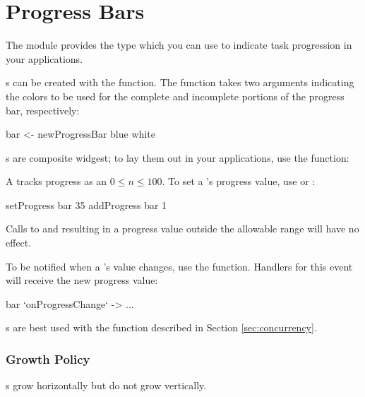 \section{Progress Bars}
\label{sec:progress_bars}

The  module provides the  type which
you can use to indicate task progression in your applications.

s can be created with the 
function.  The function takes two  arguments indicating the
colors to be used for the complete and incomplete portions of the
progress bar, respectively:

\begin{haskellcode}
 bar <- newProgressBar blue white
\end{haskellcode}

s are composite widgest; to lay them out in your
applications, use the  function:


A  tracks progress as an  $0 \le n $.
To set a 's progress value, use  or
:

\begin{haskellcode}
 setProgress bar 35
 addProgress bar 1
\end{haskellcode}

Calls to  and  resulting in a progress
value outside the allowable range will have no effect.

To be notified when a 's value changes, use the
 function.  Handlers for this event will receive
the new progress value:

\begin{haskellcode}
 bar `onProgressChange` \newVal -> ...
\end{haskellcode}

s are best used with the  function
described in Section \ref{sec:concurrency}.

\subsubsection{Growth Policy}

s grow horizontally but do not grow vertically.
